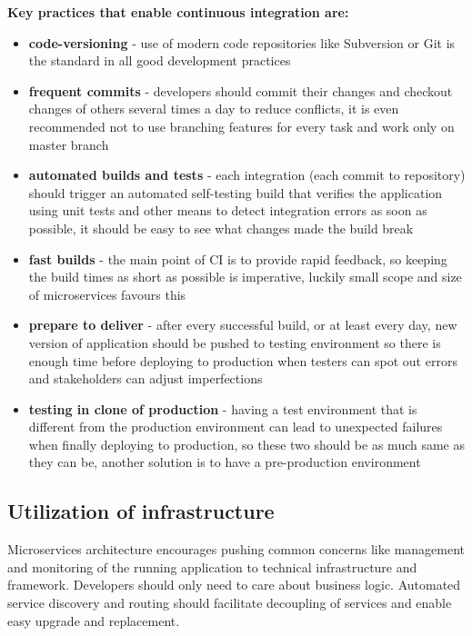 \documentclass[12pt,oneside]{fithesis2}
\begin{document}
\noindent\textbf{Key practices that enable continuous integration are:}

\begin{itemize}
\item \textbf{code-versioning} - use of modern code repositories like Subversion or Git is the standard in all good development practices
\item \textbf{frequent commits} - developers should commit their changes and checkout changes of others several times a day to reduce conflicts, it is even recommended not to use branching features for every task and work only on master branch
\item \textbf{automated builds and tests} - each integration (each commit to repository) should trigger an automated self-testing build that verifies the application using unit tests and other means to detect integration errors as soon as possible, it should be easy to see what changes made the build break
\item \textbf{fast builds} - the main point of CI is to provide rapid feedback, so keeping the build times as short as possible is imperative, luckily small scope and size of microservices favours this
\item \textbf{prepare to deliver} - after every successful build, or at least every day, new version of application should be pushed to testing environment so there is enough time before deploying to production when testers can spot out errors and stakeholders can adjust imperfections
\item \textbf{testing in clone of production} - having a test environment that is different from the production environment can lead to unexpected failures when finally deploying to production, so these two should be as much same as they can be, another solution is to have a pre-production environment
\end{itemize}

\subsection{Utilization of infrastructure}

Microservices architecture encourages pushing common concerns like management and monitoring of the running application to technical infrastructure and framework. Developers should only need to care about business logic.
Automated service discovery and routing should facilitate decoupling of services and enable easy upgrade and replacement.
\end{document}
